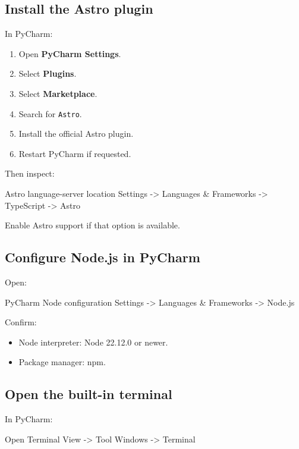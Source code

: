 \documentclass[11pt,letterpaper]{article}
\newcommand{\menu}[1]{\textbf{\textsf{#1}}}
\begin{document}
\subsection{Install the Astro plugin}

In PyCharm:

\begin{enumerate}
    \item Open \menu{PyCharm \textrightarrow{} Settings}.
    \item Select \menu{Plugins}.
    \item Select \menu{Marketplace}.
    \item Search for \texttt{Astro}.
    \item Install the official Astro plugin.
    \item Restart PyCharm if requested.
\end{enumerate}

Then inspect:

\begin{codebox}{Astro language-server location}
Settings
  -> Languages & Frameworks
  -> TypeScript
  -> Astro
\end{codebox}

Enable Astro support if that option is available.

\subsection{Configure Node.js in PyCharm}

Open:

\begin{codebox}{PyCharm Node configuration}
Settings
  -> Languages & Frameworks
  -> Node.js
\end{codebox}

Confirm:

\begin{itemize}
    \item Node interpreter: Node 22.12.0 or newer.
    \item Package manager: npm.
\end{itemize}

\subsection{Open the built-in terminal}

In PyCharm:

\begin{codebox}{Open Terminal}
View
  -> Tool Windows
  -> Terminal
\end{codebox}
\end{document}
